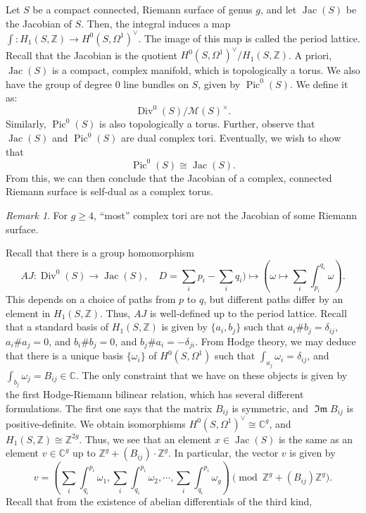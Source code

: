 \documentclass[a4paper]{report}
\theoremstyle{definition}
\theoremstyle{remark}
\newtheorem{remark}{Remark}
\theoremstyle{proposition}
\theoremstyle{conjecture}
\theoremstyle{lemma}
\theoremstyle{corollary}
\theoremstyle{exercise}
\theoremstyle{example}
\newcommand{\C}{\mathbb{C}}
\newcommand{\mcal}{\mathcal}
\newcommand{\on}{\operatorname}
\begin{document}
Let $S$ be a compact connected, Riemann surface of genus $g$, and 
let $\on{Jac}(S)$ be the Jacobian of $S$. Then, the integral induces a 
map 
$\int : H_1(S,\mathbb{Z}) \to H^0(S,\Omega^1)^\vee$.
The image of this map is called the period lattice. 
Recall that the Jacobian is the quotient 
$H^0(S,\Omega^1)^\vee/H_1(S,\mathbb{Z})$.
A priori, $\on{Jac}(S)$ is a compact, complex manifold, which is topologically
a torus.
We also have the group of degree $0$ line bundles on $S$, given by 
$\on{Pic}^0(S)$. We define it as:
$$\on{Div}^0(S)/\mcal{M}(S)^\times.$$
Similarly, $\on{Pic}^0(S)$ is also topologically a torus.
Further, observe that $\on{Jac}(S)$ and $\on{Pic}^0(S)$ are dual 
complex tori.
Eventually, we wish to show that 
$$\on{Pic}^0(S) \cong \on{Jac}(S).$$
From this, we can then conclude that the Jacobian of a complex, connected
Riemann surface is self-dual as a complex torus.
\begin{remark}
    For $g\geq 4$, ``most'' complex tori are not the Jacobian of 
    some Riemann surface.
\end{remark}
Recall that there is a group homomorphism
$$AJ : \on{Div}^0(S) \longrightarrow \on{Jac}(S), \quad D=\sum_ip_i-\sum_iq_i) \longmapsto \left(\omega \longmapsto \sum_i\int_{p_i}^{q_i}\omega\right).$$
This depends on a choice of paths from $p$ to $q$, but different paths 
differ by an element in $H_1(S,\mathbb{Z})$. Thus, $AJ$ is well-defined
up to the period lattice.
Recall that a standard basis of $H_1(S,\mathbb{Z})$ 
is given by $\lbrace a_i,b_j\rbrace$ such that 
$a_i \# b_j = \delta_{ij}$, 
$a_i \# a_j = 0$, and $b_i \# b_j = 0$,
and $b_j \# a_i = -\delta_{ji}$.
From Hodge theory, we may deduce that there is a unique basis 
$\lbrace \omega_i\rbrace$ of $H^0(S,\Omega^1)$ such that 
$\int_{a_j}\omega_i = \delta_{ij}$, and 
$\int_{b_j}\omega_j = B_{ij} \in \C$.
The only constraint that we have on these objects is given by the 
first Hodge-Riemann bilinear relation, which has several different formulations.
The first one says that the matrix $B_{ij}$ is symmetric, and 
$\on{\mathfrak{Im}}B_{ij}$ is positive-definite.
We obtain isomorphisms 
$H^0(S,\Omega^1)^\vee \cong \C^g$, and $H_1(S,\mathbb{Z}) \cong \mathbb{Z}^{2g}$.
Thus, we see that an element
$x \in \on{Jac}(S)$ is the same as an element $v\in \C^g$ up to
$\mathbb{Z}^g + (B_{ij})\cdot\mathbb{Z}^g$.
In particular, the vector $v$ is given by 
$$v = \left(
    \sum_i\int_{q_i}^{p_i}\omega_1,
    \sum_i\int_{q_i}^{p_i}\omega_2,
    \cdots,
\sum_i\int_{q_i}^{p_i}\omega_g\right) \pmod{\mathbb{Z}^g + (B_{ij})\mathbb{Z}^g}.$$
Recall that from the existence of abelian differentials of the third kind, 
\end{document}
